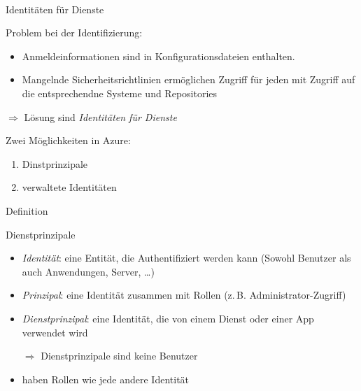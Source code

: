 \documentclass{scrartcl}
\newenvironment{flashcard}[2][]{%
    #1
    \vfill
    \centerline{\Large{#2}}
    \vfill
\newpage
}
{\newpage}
\begin{document}
    \begin{flashcard}[\ ]{Identitäten für Dienste}
            Problem bei der Identifizierung:
            \begin{itemize}
                \item Anmeldeinformationen sind in Konfigurationsdateien enthalten.
                \item Mangelnde Sicherheitsrichtlinien ermöglichen Zugriff für jeden mit Zugriff auf die entsprechendne Systeme und Repositories
            \end{itemize}
            $\Rightarrow$ Lösung sind \emph{Identitäten für Dienste}

            Zwei Möglichkeiten in Azure:
            \begin{enumerate}
                \item Dinstprinzipale
                \item verwaltete Identitäten
            \end{enumerate}
    \end{flashcard}

    \begin{flashcard}[Definition]{Dienstprinzipale}
            \begin{itemize}
                \item \emph{Identität}: eine Entität, die Authentifiziert werden kann\newline
                    (Sowohl Benutzer als auch Anwendungen, Server, …)
                \item \emph{Prinzipal}: eine Identität zusammen mit Rollen\newline
                    (z.\,B. Administrator-Zugriff)
                \item \emph{Dienstprinzipal}: eine Identität, die von einem Dienst oder einer App verwendet wird
                \item[$\Rightarrow $] Dienstprinzipale sind keine Benutzer
                \item haben Rollen wie jede andere Identität
            \end{itemize}
    \end{flashcard}
\end{document}
